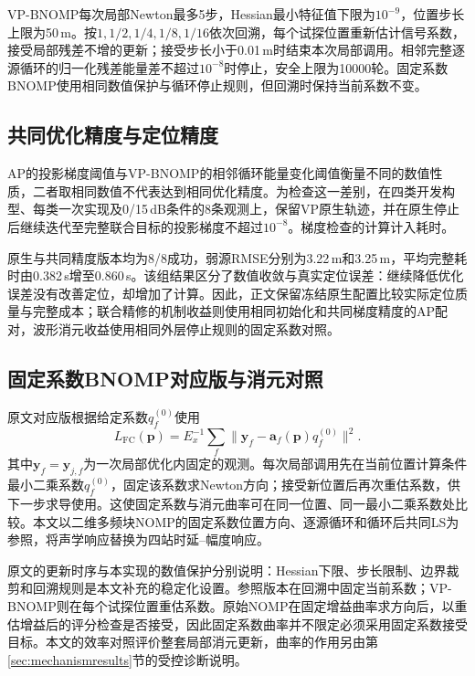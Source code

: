 \documentclass[a4paper,fleqn]{cas-sc}
\numberwithin{equation}{section}
\numberwithin{figure}{section}
\numberwithin{table}{section}
\begin{document}
VP-BNOMP每次局部Newton最多5步，Hessian最小特征值下限为$10^{-9}$，位置步长上限为50\,m。按$1,1/2,1/4,1/8,1/16$依次回溯，每个试探位置重新估计信号系数，接受局部残差不增的更新；接受步长小于0.01\,m时结束本次局部调用。相邻完整逐源循环的归一化残差能量差不超过$10^{-8}$时停止，安全上限为10000轮。固定系数BNOMP使用相同数值保护与循环停止规则，但回溯时保持当前系数不变。

\subsection{共同优化精度与定位精度}\label{app:stoppingprecision}
AP的投影梯度阈值与VP-BNOMP的相邻循环能量变化阈值衡量不同的数值性质，二者取相同数值不代表达到相同优化精度。为检查这一差别，在四类开发构型、每类一次实现及0/15\,dB条件的8条观测上，保留VP原生轨迹，并在原生停止后继续迭代至完整联合目标的投影梯度不超过$10^{-8}$。梯度检查的计算计入耗时。

原生与共同精度版本均为8/8成功，弱源RMSE分别为3.22\,m和3.25\,m，平均完整耗时由0.382\,s增至0.860\,s。该组结果区分了数值收敛与真实定位误差：继续降低优化误差没有改善定位，却增加了计算。因此，正文保留冻结原生配置比较实际定位质量与完整成本；联合精修的机制收益则使用相同初始化和共同梯度精度的AP配对，波形消元收益使用相同外层停止规则的固定系数对照。

\subsection{固定系数BNOMP对应版与消元对照}
原文对应版根据给定系数$q_f^{(0)}$使用
\begin{equation}
 L_{\mathrm{FC}}(\bm p)=E_x^{-1}\sum_f
 \|\bm y_f-\bm a_f(\bm p)q_f^{(0)}\|^2 .\label{eq:fixedcoef}
\end{equation}
其中$\bm y_f=\bm y_{j,f}$为一次局部优化内固定的观测。每次局部调用先在当前位置计算条件最小二乘系数$q_f^{(0)}$，固定该系数求Newton方向；接受新位置后再次重估系数，供下一步求导使用。这使固定系数与消元曲率可在同一位置、同一最小二乘系数处比较。本文以二维多频块NOMP\cite{Yang2022}的固定系数位置方向、逐源循环和循环后共同LS为参照，将声学响应替换为四站时延--幅度响应。

原文的更新时序与本实现的数值保护分别说明：Hessian下限、步长限制、边界裁剪和回溯规则是本文补充的稳定化设置。参照版本在回溯中固定当前系数；VP-BNOMP则在每个试探位置重估系数。原始NOMP在固定增益曲率求方向后，以重估增益后的评分检查是否接受\cite{Mamandipoor2016}，因此固定系数曲率并不限定必须采用固定系数接受目标。本文的效率对照评价整套局部消元更新，曲率的作用另由第\ref{sec:mechanismresults}节的受控诊断说明。
\end{document}

